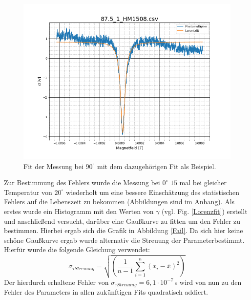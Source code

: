 \begin{figure}[ht]
	\includegraphics[scale=0.5]{Bild/90GradLorenz}
	\centering
	\caption[Fit der Lorentzkurve bei für 90Grad]{Fit der Messung bei $90^\circ$ mit dem dazugehörigen Fit als Beispiel.}
	\label{Lo90}
\end{figure}
\FloatBarrier
Zur Bestimmung des Fehlers wurde die Messung bei $0^\circ$ $15$ mal bei gleicher Temperatur von $20^\circ$ wiederholt um eine bessere Einschätzung des statistischen Fehlers auf die Lebenszeit zu bekommen (Abbildungen sind im Anhang). Als erstes wurde ein Histogramm mit den Werten von $\gamma$ (vgl. Fig. \ref{Lorenzfit}) erstellt und anschließend versucht, darüber eine Gaußkurve zu fitten um den Fehler zu bestimmen. Hierbei ergab sich die Grafik in Abbildung \ref{Fail}. Da sich hier keine schöne Gaußkurve ergab wurde alternativ die Streuung der Parameterbestimmt. Hierfür wurde die folgende Gleichung verwendet:
\begin{equation}
	\sigma_{\tau Streuung}=\sqrt{\left(\frac{1}{n-1}\sum_{i=1}^{n}(x_i-\bar{x})^2\right)}
\end{equation}
Der hierdurch erhaltene Fehler  von $\sigma_{\tau Streuung}=6,1\cdot10^{-7}\,$s wird von nun zu den Fehler des Parameters in allen zukünftigen Fits quadratisch addiert.
